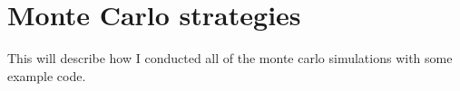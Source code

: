 

\chapter{Monte Carlo strategies}
This will describe how I conducted all of the monte carlo simulations with some example code.
